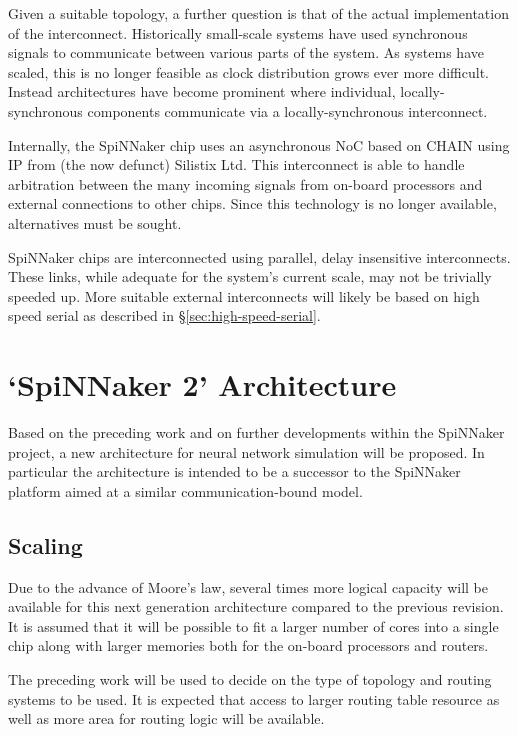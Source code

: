 		Given a suitable topology, a further question is that of the actual
		implementation of the interconnect. Historically small-scale systems have
		used synchronous signals to communicate between various parts of the system.
		As systems have scaled, this is no longer feasible as clock distribution
		grows ever more difficult. Instead architectures have become prominent where
		individual, locally-synchronous components communicate via a
		locally-synchronous interconnect.
		
		Internally, the SpiNNaker chip uses an asynchronous NoC based on CHAIN
		\cite{plana07,bainbridge02} using IP from (the now defunct) Silistix Ltd.
		This interconnect is able to handle arbitration between the many incoming
		signals from on-board processors and external connections to other chips.
		Since this technology is no longer available, alternatives must be sought.
		
		SpiNNaker chips are interconnected using parallel, delay insensitive
		interconnects. These links, while adequate for the system's current scale,
		may not be trivially speeded up. More suitable external interconnects will
		likely be based on high speed serial as described in
		\S\ref{sec:high-speed-serial}.
		
		\section{`SpiNNaker 2' Architecture}
		
		Based on the preceding work and on further developments within the
		SpiNNaker project, a new architecture for neural network simulation will be
		proposed. In particular the architecture is intended to be a successor to
		the SpiNNaker platform aimed at a similar communication-bound model.
		
		\subsection{Scaling}
			
			Due to the advance of Moore's law, several times more logical capacity
			will be available for this next generation architecture compared to the
			previous revision. It is assumed that it will be possible to fit a larger
			number of cores into a single chip along with larger memories both for the
			on-board processors and routers.
			
			The preceding work will be used to decide on the type of topology and
			routing systems to be used. It is expected that access to larger routing
			table resource as well as more area for routing logic will be available.
		
